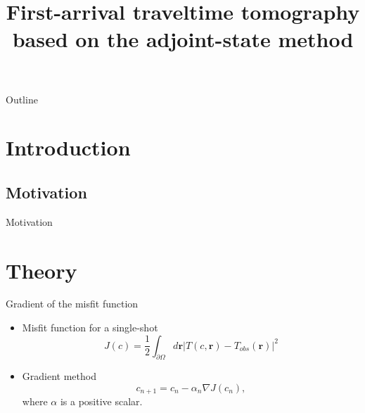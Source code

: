 \documentclass{beamer}
\title{First-arrival traveltime tomography based on the adjoint-state method}
\begin{document}
 
 \begin{frame}
  \titlepage
 \end{frame}

 \begin{frame}{Outline}
  \tableofcontents
 \end{frame}
 
 \section{Introduction}
 
 \subsection{Motivation}
 
 \begin{frame}{Motivation}
  
 \end{frame}

 \section{Theory}
 
 \begin{frame}{Gradient of the misfit function}
 
  \begin{itemize}
   \item Misfit function for a single-shot
   \begin{equation}
    J({c}) = \frac{1}{2}\int_{\partial\Omega}d\boldsymbol{r}|T({c},\boldsymbol{r}) - T_{obs}(\boldsymbol{r})|^2
   \end{equation}
   
   \item Gradient method
   \begin{equation}
    {c}_{n+1} = {c}_n - \alpha_n\nabla J({c}_n),
   \end{equation}
    where $\alpha$ is a positive scalar.
  \end{itemize}

 \end{frame}
\end{document}
